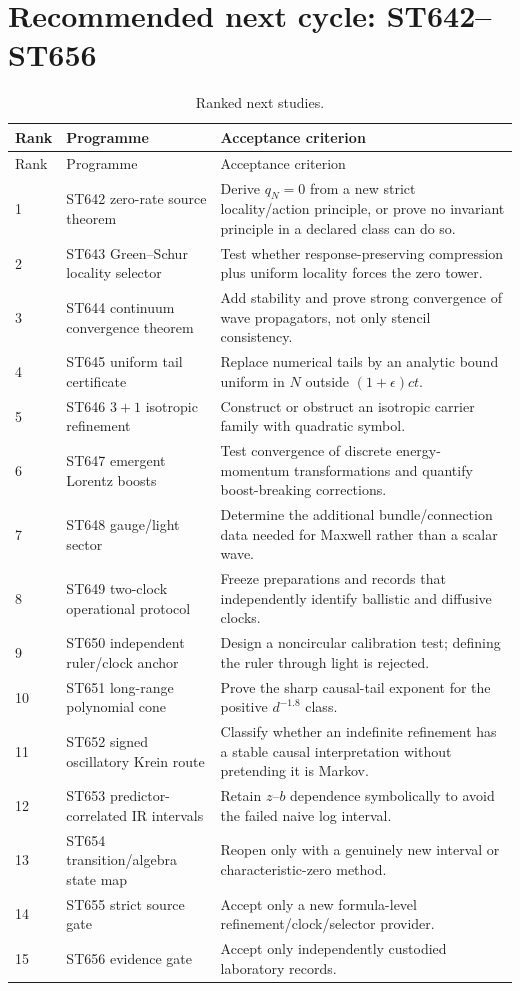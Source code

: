 \documentclass[11pt,a4paper]{article}
\theoremstyle{remark}\newtheorem{remark}[theorem]{Remark}
\begin{document}
\section{Recommended next cycle: ST642--ST656}
\begin{longtable}{@{}p{}p{}p{}@{}}\caption{Ranked next studies.}\\\toprule Rank&Programme&Acceptance criterion\\\midrule\endfirsthead\toprule Rank&Programme&Acceptance criterion\\\midrule\endhead
1&ST642 zero-rate source theorem&Derive $q_N=0$ from a new strict locality/action principle, or prove no invariant principle in a declared class can do so.\\
2&ST643 Green--Schur locality selector&Test whether response-preserving compression plus uniform locality forces the zero tower.\\
3&ST644 continuum convergence theorem&Add stability and prove strong convergence of wave propagators, not only stencil consistency.\\
4&ST645 uniform tail certificate&Replace numerical tails by an analytic bound uniform in $N$ outside $(1+\epsilon)ct$.\\
5&ST646 $3+1$ isotropic refinement&Construct or obstruct an isotropic carrier family with quadratic symbol.\\
6&ST647 emergent Lorentz boosts&Test convergence of discrete energy-momentum transformations and quantify boost-breaking corrections.\\
7&ST648 gauge/light sector&Determine the additional bundle/connection data needed for Maxwell rather than a scalar wave.\\
8&ST649 two-clock operational protocol&Freeze preparations and records that independently identify ballistic and diffusive clocks.\\
9&ST650 independent ruler/clock anchor&Design a noncircular calibration test; defining the ruler through light is rejected.\\
10&ST651 long-range polynomial cone&Prove the sharp causal-tail exponent for the positive $d^{-1.8}$ class.\\
11&ST652 signed oscillatory Krein route&Classify whether an indefinite refinement has a stable causal interpretation without pretending it is Markov.\\
12&ST653 predictor-correlated IR intervals&Retain $z$--$b$ dependence symbolically to avoid the failed naive log interval.\\
13&ST654 transition/algebra state map&Reopen only with a genuinely new interval or characteristic-zero method.\\
14&ST655 strict source gate&Accept only a new formula-level refinement/clock/selector provider.\\
15&ST656 evidence gate&Accept only independently custodied laboratory records.\\\bottomrule\end{longtable}
\end{document}
